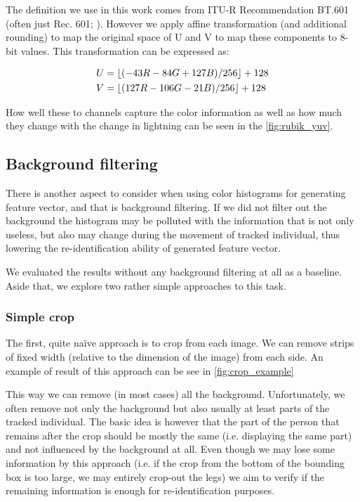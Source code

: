The definition we use in this work comes from ITU-R Recommendation BT.601
(often just Rec. 601; \cite{bt2011studio}). However we apply affine
transformation (and additional rounding) to map the original space of U and V
to map these components to 8-bit values. This transformation can be expressed
as:

\begin{align*}
U &= \lfloor(-43R - 84G + 127B) / 256\rfloor + 128 \\
V &= \lfloor(127R - 106G - 21B) / 256\rfloor + 128
\end{align*}

How well these to channels capture the color information as well as how
much they change with the change in lightning can be seen in the
\autoref{fig:rubik_yuv}.

\subsection{Background filtering}

There is another aspect to consider when using color histograms for generating
feature vector, and that is background filtering. If we did not filter out
the background the histogram may be polluted with the information that is not
only useless, but also may change during the movement of tracked individual,
thus lowering the re-identification ability of generated feature vector.

We evaluated the results without any background filtering at all as a baseline.
Aside that, we explore two rather simple approaches to this task. 

\subsubsection{Simple crop}

The first, quite naïve approach is to crop from each image. We can remove
strips of fixed width (relative to the dimension of the image) from each side.
An example of result of this approach can be see in \autoref{fig:crop_example}

This way we can remove (in most cases) all the background.
Unfortunately, we often remove not only the background but also usually at
least parts of the tracked individual. The basic idea is however that the
part of the person that remains after the crop should be mostly the same
(i.e. displaying the same part) and not influenced by the background at all.
Even though we may lose some information by this approach (i.e. if the crop
from the bottom of the bounding box is too large, we may entirely crop-out
the legs) we aim to verify if the remaining information is enough for
re-identification purposes.


